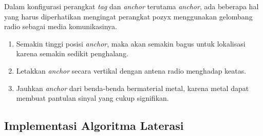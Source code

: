 Dalam konfigurasi perangkat \textit{tag} dan \textit{anchor} terutama \textit{anchor}, ada beberapa hal yang harus diperhatikan mengingat perangkat pozyx menggunakan gelombang radio sebagai media komunikasinya.
\begin{enumerate}[nolistsep]
	\item Semakin tinggi posisi \textit{anchor}, maka akan semakin bagus untuk lokalisasi karena semakin sedikit penghalang.
	\item Letakkan \textit{anchor} secara vertikal dengan antena radio menghadap keatas.
	\item Jauhkan \textit{anchor} dari benda-benda bermaterial metal, karena metal dapat membuat pantulan sinyal yang cukup signifikan.
\end{enumerate}

\subsection{Implementasi Algoritma Laterasi}
\vspace{1ex}

